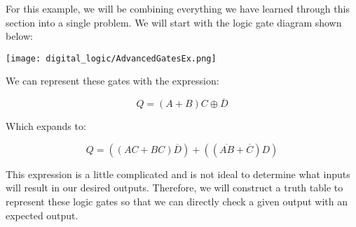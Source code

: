     \begin{example} \label{ex:advanced-logic-gates}
        For this example, we will be combining everything we have learned through this section into a single problem.
        We will start with the logic gate diagram shown below:
        
        \begin{center}
            \texttt{[image: digital\_logic/AdvancedGatesEx.png]}
        \end{center}

        We can represent these gates with the expression:

        \begin{equation*}
            Q = (A+B)C \oplus \overline{D}
        \end{equation*}

        Which expands to:

        \begin{equation*}
            Q = \left((AC + BC)\overline{D}\right) + \left((\overline{AB} + \overline{C})D\right)
        \end{equation*}

        This expression is a little complicated and is not ideal to determine what inputs will result in our desired outputs.
        Therefore, we will construct a truth table to represent these logic gates so that we can directly check a given output with an expected output.


\end{example}
